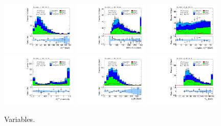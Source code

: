 \begin{figure}[tp]
  \includegraphics[width=0.32\textwidth]{figures/analysis/vbf-topCR/met-pt-hi}
  \includegraphics[width=0.32\textwidth]{figures/analysis/vbf-topCR/mMMC}
  \includegraphics[width=0.32\textwidth]{figures/analysis/vbf-topCR/mT}
  \includegraphics[width=0.32\textwidth]{figures/analysis/vbf-topCR/met-phi-centrality}
  \includegraphics[width=0.32\textwidth]{figures/analysis/vbf-topCR/H-pt-hi}
  \includegraphics[width=0.32\textwidth]{figures/analysis/vbf-topCR/mvis}
  \caption{Variables.}
  \label{fig:backgrounds-topCR-taus}
\end{figure}

